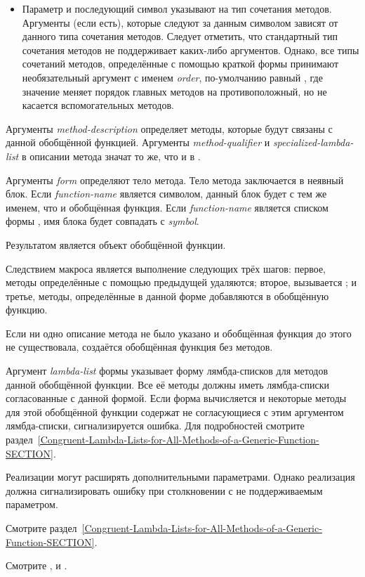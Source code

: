 \begin{defmac}
\begin{itemize}
\item 
Параметр  и последующий символ указывают на тип
сочетания методов. Аргументы (если есть), которые следуют за данным символом
зависят от данного типа сочетания методов. Следует отметить, что стандартный
тип сочетания методов не поддерживает каких-либо аргументов. Однако, все типы
сочетаний методов, определённые с помощью краткой формы
 принимают необязательный аргумент с именем
\emph{order}, по-умолчанию равный , где значение
 меняет порядок главных методов на противоположный, но
не касается вспомогательных методов.
\end{itemize}

Аргументы \emph{method-description} определяет методы, которые будут связаны с
данной обобщённой функцией. Аргументы \emph{method-qualifier} и
\emph{specialized-lambda-list} в описании метода значат то же, что и в
.

Аргументы \emph{form} определяют тело метода. Тело метода заключается в неявный
блок. Если \emph{function-name} является символом, данный блок будет с тем же
именем, что и обобщённая функция. Если \emph{function-name} является списком
формы , имя блока будет совпадать с \emph{symbol}.

Результатом является объект обобщённой функции.

Следствием макроса  является выполнение следующих трёх шагов:
первое, методы определённые с помощью предыдущей  удаляются;
второе, вызывается ; и третье, методы, определённые
в данной форме  добавляются в обобщённую функцию.

Если ни одно описание метода не было указано и обобщённая функция до этого не
существовала, создаётся обобщённая функция без методов.

Аргумент \emph{lambda-list} формы  указывает форму
лямбда-списков для методов данной обобщённой функции. Все её методы должны иметь
лямбда-списки согласованные с данной формой. Если форма 
вычисляется и некоторые методы для этой обобщённой функции содержат не
согласующиеся с этим аргументом лямбда-списки, сигнализируется ошибка. Для
подробностей смотрите
раздел~\ref{Congruent-Lambda-Lists-for-All-Methods-of-a-Generic-Function-SECTION}.

Реализации могут расширять  дополнительными параметрами.
Однако реализация должна сигнализировать ошибку при столкновении с
не поддерживаемым параметром.

Смотрите
раздел~\ref{Congruent-Lambda-Lists-for-All-Methods-of-a-Generic-Function-SECTION}.

Смотрите ,  и
.
\end{defmac}

